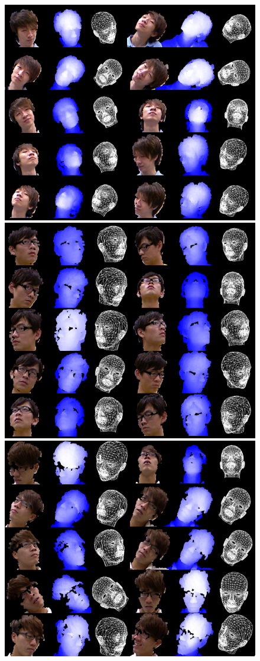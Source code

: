 \begin{figure}
\includegraphics[width=1.0\linewidth]{./fig12a.png}
\includegraphics[width=1.0\linewidth]{./fig12b.png}
\includegraphics[width=1.0\linewidth]{./fig12c.png}

\end{figure}
